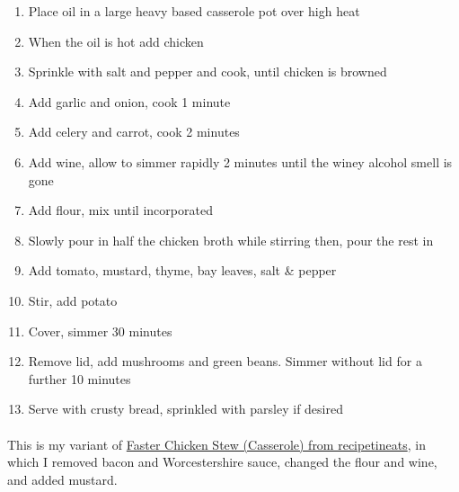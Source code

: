\documentclass[11pt,a4paper]{article}
\begin{document}
\begin{enumerate}
	\item Place oil in a large heavy based casserole pot over high heat
	\item When the oil is hot add chicken
	\item Sprinkle with salt and pepper and cook, until chicken is browned
	\item Add garlic and onion, cook 1 minute
	\item Add celery and carrot, cook 2 minutes
	\item Add wine, allow to simmer rapidly 2 minutes until the winey alcohol smell is gone
	\item Add flour, mix until incorporated
	\item Slowly pour in half the chicken broth while stirring then, pour the rest in
	\item Add tomato, mustard, thyme, bay leaves, salt \& pepper
	\item Stir, add potato
	\item Cover, simmer 30 minutes
	\item Remove lid, add mushrooms and green beans. Simmer without lid for a further 10 minutes
	\item Serve with crusty bread, sprinkled with parsley if desired
\end{enumerate}

\paragraph{}
This is my variant of
\href{https://www.recipetineats.com/chicken-stew-casserole/}{Faster Chicken Stew (Casserole) from recipetineats},
in which I removed bacon and Worcestershire sauce, changed the flour and wine, and added mustard.
\end{document}

